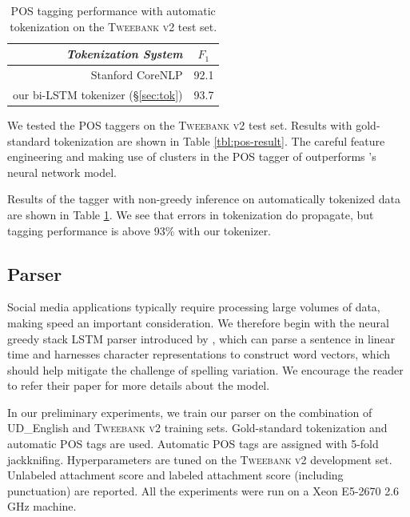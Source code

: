 \documentclass[11pt,a4paper]{article}
\begin{document}
\begin{table}[t]
	\centering
	\begin{tabular}{rc}
		\hline
		\it Tokenization System & $F_1$ \\
		\hline
		Stanford CoreNLP & 92.1 \\
		our bi-LSTM tokenizer (\S\ref{sec:tok}) & 93.7 \\
		\hline
	\end{tabular}
	\caption{\citet{owoputi-EtAl:2013:NAACL-HLT} POS tagging performance with automatic tokenization on
          the \textsc{Tweebank v2} test set. \label{tbl:pos-result-vs-tok}}
\end{table}

We tested the POS taggers on the \textsc{Tweebank v2} test set.  Results
with gold-standard tokenization are shown in
Table \ref{tbl:pos-result}. The careful feature engineering and making use of
\citet{Brown:1992:CNG:176313.176316} clusters in the 
POS tagger of \citet{owoputi-EtAl:2013:NAACL-HLT} outperforms \citet{ma-hovy:2016:P16-1}'s neural network
model. 

Results of the \citet{owoputi-EtAl:2013:NAACL-HLT}  tagger with non-greedy
inference on automatically tokenized data
are shown in  Table \ref{tbl:pos-result-vs-tok}.  We see that errors
in tokenization do propagate, but tagging performance is above 93\%
with our tokenizer. 

\subsection{Parser}

Social media applications typically require processing large volumes
of data, making speed an important consideration. We therefore 
begin with the neural greedy stack LSTM parser introduced by ,
which can parse a sentence in linear time and harnesses 
character representations to construct word vectors, which should help mitigate the challenge of
spelling variation. We encourage the reader to refer their paper for
more details about the model.

In our preliminary experiments, we train our parser on the combination of UD\_English
and \textsc{Tweebank v2} training sets. Gold-standard tokenization and automatic POS
tags are used. Automatic POS tags are assigned with 5-fold
jackknifing. Hyperparameters %
are tuned on the \textsc{Tweebank v2} development set. Unlabeled attachment score and
labeled attachment score (including punctuation) are reported.
All the experiments were run on a Xeon E5-2670 2.6 GHz machine.
\end{document}
